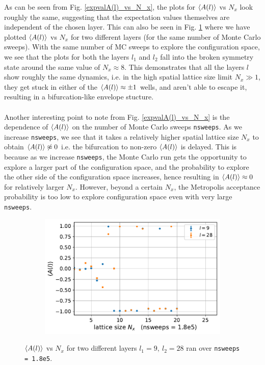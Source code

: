\documentclass[../journal_main.tex]{subfiles}
\begin{document}
As can be seen from Fig. \ref{expvalA(l)_vs_N_x}, the plots for $\expval{A(l)}$ vs $N_x$ look roughly the same, suggesting that the expectation values themselves are independent of the chosen layer. This can also be seen in Fig. \ref{differentlayer_sameMCsweeps} where we have plotted $\expval{A(l)}$ vs $N_x$ for two different layers (for the same number of Monte Carlo sweeps). With the same number of MC sweeps to explore the configuration space, we see that the plots for both the layers $l_1$ and $l_2$ fall into the broken symmetry state around the same value of $N_x \approx 8$. This demonstrates that all the layers $l$ show roughly the same dynamics, i.e. in the high spatial lattice size limit $N_x \gg 1$, they get stuck in either of the $\expval{A(l)} \approx \pm 1$ wells, and aren't able to escape it, resulting in a bifurcation-like envelope stucture.~\\~\\
Another interesting point to note from Fig. \ref{expvalA(l)_vs_N_x} is the dependence of $\expval{A(l)}$ on the number of Monte Carlo sweeps \texttt{nsweeps}. As we increase \texttt{nsweeps}, we see that it takes a relatively higher spatial lattice size $N_x$ to obtain $\expval{A(l)} \not\approx 0$ i.e. the bifurcation to non-zero $\expval{A(l)}$ is delayed. This is because as we increase \texttt{nsweeps}, the Monte Carlo run gets the opportunity to explore a larger part of the configuration space, and the probability to explore the other side of the configuration space increases, hence resulting in $\expval{A(l)} \approx 0$ for relatively larger $N_x$. However, beyond a certain $N_x$, the Metropolis acceptance probability is too low to explore configuration space even with very large \texttt{nsweeps}.       
\begin{figure}[!htb]
    \centering
    \begin{subfigure}[b]{0.57\textwidth}
        \centering
        \includegraphics[width=\textwidth]{images/expval(A_l)_vs_N_x/A vs N_x (nsweeps=1.8e5).pdf}
    \end{subfigure}
    \caption{$\expval{A(l)}$ vs $N_x$ for two different layers $l_1 = 9,\: l_2 = 28$ ran over \texttt{nsweeps = 1.8e5}.}
    \label{differentlayer_sameMCsweeps}
\end{figure}
\FloatBarrier
\end{document}
